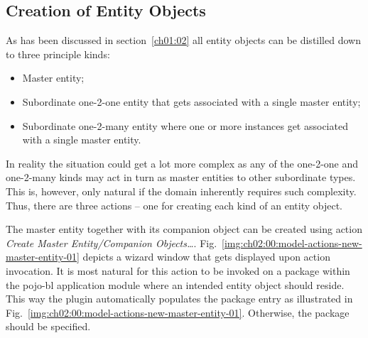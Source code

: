   \subsection{Creation of Entity Objects}

  As has been discussed in section~\ref{ch01:02} all entity objects can be distilled down to three principle kinds:
  
  \begin{itemize}
   \item Master entity;
   \item Subordinate one-2-one entity that gets associated with a single master entity;
   \item Subordinate one-2-many entity where one or more instances get associated with a single master entity.
  \end{itemize}

  In reality the situation could get a lot more complex as any of the one-2-one and one-2-many kinds may act in turn as master entities to other subordinate types. 
  This is, however, only natural if the domain inherently requires such complexity.  
  Thus, there are three actions -- one for creating each kind of an entity object.
  
  The master entity together with its companion object can be created using action \emph{Create Master Entity/Companion Objects\ldots}.
  Fig.~\ref{img:ch02:00:model-actions-new-master-entity-01} depicts a wizard window that gets displayed upon action invocation.
  It is most natural for this action to be invoked on a package within the pojo-bl application module where an intended entity object should reside.
  This way the plugin automatically populates the package entry as illustrated in Fig.~\ref{img:ch02:00:model-actions-new-master-entity-01}.
  Otherwise, the package should be specified.
  
